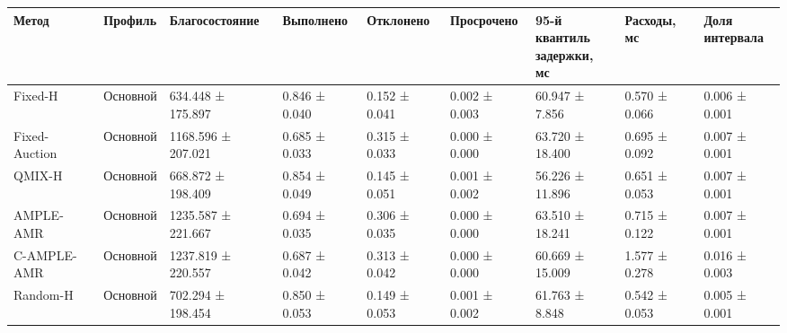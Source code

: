\begin{tabular}{lllllllll}
\toprule
 Метод & Профиль & Благосостояние & Выполнено & Отклонено & Просрочено & \shortstack{95-й квантиль\\задержки, мс} & Расходы, мс & \shortstack{Доля\\интервала} \\
\midrule
 Fixed-H & Основной & 634.448 ± 175.897 & 0.846 ± 0.040 & 0.152 ± 0.041 & 0.002 ± 0.003 & 60.947 ± 7.856 & 0.570 ± 0.066 & 0.006 ± 0.001 \\
 Fixed-Auction & Основной & 1168.596 ± 207.021 & 0.685 ± 0.033 & 0.315 ± 0.033 & 0.000 ± 0.000 & 63.720 ± 18.400 & 0.695 ± 0.092 & 0.007 ± 0.001 \\
 QMIX-H & Основной & 668.872 ± 198.409 & 0.854 ± 0.049 & 0.145 ± 0.051 & 0.001 ± 0.002 & 56.226 ± 11.896 & 0.651 ± 0.053 & 0.007 ± 0.001 \\
 AMPLE-AMR & Основной & 1235.587 ± 221.667 & 0.694 ± 0.035 & 0.306 ± 0.035 & 0.000 ± 0.000 & 63.510 ± 18.241 & 0.715 ± 0.122 & 0.007 ± 0.001 \\
 C-AMPLE-AMR & Основной & 1237.819 ± 220.557 & 0.687 ± 0.042 & 0.313 ± 0.042 & 0.000 ± 0.000 & 60.669 ± 15.009 & 1.577 ± 0.278 & 0.016 ± 0.003 \\
 Random-H & Основной & 702.294 ± 198.454 & 0.850 ± 0.053 & 0.149 ± 0.053 & 0.001 ± 0.002 & 61.763 ± 8.848 & 0.542 ± 0.053 & 0.005 ± 0.001 \\
\bottomrule
\end{tabular}
